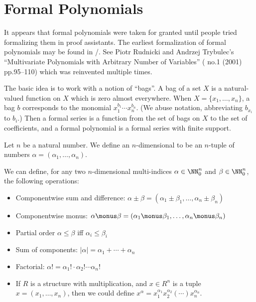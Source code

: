 \section{Formal Polynomials}

\begin{remark}
It appears that formal polynomials were taken for granted until people
tried formalizing them in proof assistants. The earliest formalization
of formal polynomials may be found in \Mizar/. See Piotr Rudnicki
and Andrzej Trybulec's ``Multivariate Polynomials with Arbitrary
Number of Variables'' (
no.1 (2001) pp.95--110) which was reinvented multiple times.\nocite{rudnicki2001multivariate}

The basic idea is to work with a notion of ``bags''. A bag of a set
$X$ is a natural-valued function on $X$ which is zero almost everywhere.
When $X=\{x_{1},\dots,x_{n}\}$, a bag $b$ corresponds to the monomial
$x_{1}^{b_{1}}\cdots x_{n}^{b_{n}}$. (We abuse notation, abbreviating
$b_{x_{i}}$ to $b_{i}$.) Then a formal series is a
function from the set of bags on $X$ to the set of coefficients, and a
formal polynomial is a formal series with finite support.
\end{remark}

\begin{definition}
Let $n$ be a natural number. We define an $n$-dimensional 
to be an $n$-tuple of numbers
$\alpha=(\alpha_{1},\dots,\alpha_{n})$.

We can define, for any two $n$-dimensional multi-indices
$\alpha\in\NN_{0}^{n}$ and $\beta\in\NN_{0}^{n}$, the following
operations:
\begin{itemize}
\item Componentwise sum and difference: $\alpha\pm\beta=(\alpha_{1}\pm\beta_{1},\dots,\alpha_{n}\pm\beta_{n})$
\item Componentwise monus: $\alpha\monus\beta=(\alpha_{1}\monus\beta_{1},\dots,\alpha_{n}\monus\beta_{n})$
\item Partial order $\alpha\leq\beta$ iff $\alpha_{i}\leq\beta_{i}$
\item Sum of components: $|\alpha|=\alpha_{1}+\cdots+\alpha_{n}$
\item Factorial: $\alpha!=\alpha_{1}!\cdot\alpha_{2}!\cdots\alpha_{n}!$
\item If $R$ is a structure with multiplication, and $x\in R^{n}$ is a
  tuple $x=(x_{1},\dots,x_{n})$, then we
  could define $x^{\alpha} = x_{1}^{\alpha_{1}}x_{2}^{\alpha_{2}}(\cdots)x_{n}^{\alpha_{n}}$.
\end{itemize}
\end{definition}

